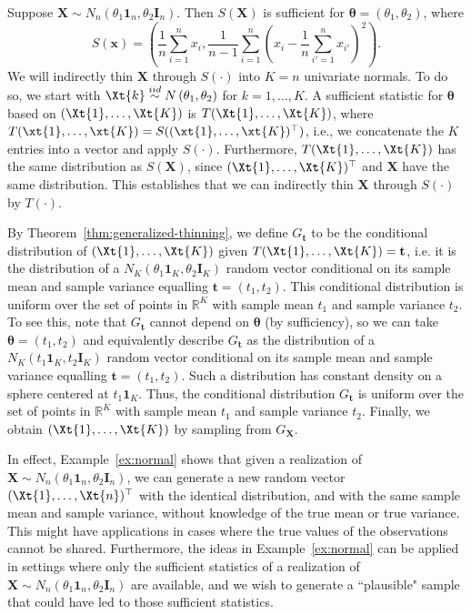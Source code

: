 \documentclass[12pt]{article}
\begin{document}
\begin{exmp} \label{ex:normal} 
Suppose $\mathbf{X}\sim N_n(\theta_1\mathbf{1}_n, \theta_2\mathbf{I}_n)$. Then $S(\mathbf{X})$ is sufficient for $\boldsymbol\theta=(\theta_1,\theta_2)$, where
$$
S(\mathbf{x}) =  \left( \frac{1}{n} \sum_{i=1}^n x_i, \frac{1}{n-1}\sum_{i=1}^{n}\left(x_i -  \frac{1}{n} \sum_{i'=1}^n x_{i'}\right)^2 \right).
$$ 
We will indirectly thin $\mathbf{X}$ through $S(\cdot)$ into $K=n$ univariate normals.
To do so, we start with  $\Xt{k} \overset{iid}{\sim} N\left(\theta_1,\theta_2\right)$ for $k=1,\ldots,K$. A sufficient statistic for $\boldsymbol\theta$ based on $(\Xt{1},\ldots,\Xt{K})$ is $T(\Xt{1},\ldots,\Xt{K})$,  where
$T(\xt{1},\ldots,\xt{K})=S((\xt{1},\ldots,\xt{K})^\top)$,
i.e., we concatenate the $K$ entries into a vector and apply $S(\cdot)$.  
Furthermore, $T(\Xt{1},\ldots,\Xt{K})$ has the same distribution as $S(\mathbf{X})$, since  $(\Xt{1},\ldots,\Xt{K})^\top$ and $\mathbf{X}$ have the same distribution. 
This establishes that we can indirectly thin $\mathbf{X}$ through $S(\cdot)$ by $T(\cdot)$. 

By Theorem~\ref{thm:generalized-thinning}, we define $G_{\mathbf{t}}$ to be the conditional distribution of  $(\Xt{1},\ldots,\Xt{K})$ given $T(\Xt{1},\ldots,\Xt{K})=\mathbf{t}$, i.e. it is the distribution of a $N_K(\theta_1\mathbf{1}_K, \theta_2\mathbf{I}_K)$ random vector conditional on its sample mean and sample variance equalling $\mathbf{t}=(t_1,t_2)$.  
This conditional distribution is uniform over the set of points in $\mathbb{R}^K$ with sample mean $t_1$ and sample variance $t_2$.  To see this, note that $G_{\mathbf{t}}$ cannot depend on $\boldsymbol\theta$ (by sufficiency), so we can take $\boldsymbol\theta=(t_1,t_2)$ and equivalently describe $G_{\mathbf{t}}$ as the distribution of a $N_K(t_1\mathbf{1}_K, t_2\mathbf{I}_K)$ random vector conditional on its sample mean and sample variance equalling $\mathbf{t}=(t_1,t_2)$.  Such a distribution has constant density on a sphere centered at $t_1\mathbf{1}_K$.  Thus, the conditional distribution $G_{\mathbf{t}}$ is uniform over the set of points in $\mathbb{R}^K$ with sample mean $t_1$ and sample variance $t_2$. Finally, we obtain $(\Xt{1},\ldots,\Xt{K})$ by sampling from $G_{\mathbf{X}}$.
\end{exmp}
In effect, Example~\ref{ex:normal} shows that given a realization of $\mathbf{X}\sim N_n(\theta_1\mathbf{1}_n, \theta_2\mathbf{I}_n)$, we can generate a new random vector $(\Xt{1},\ldots,\Xt{n})^\top$ with the identical distribution,  and with the same sample mean and sample variance, without knowledge of the true mean or true variance. 
This might have applications in cases where the true values of the observations cannot be shared. 
Furthermore, the ideas in  Example~\ref{ex:normal} can be applied in settings where only the sufficient statistics of a realization of $\mathbf{X}\sim N_n(\theta_1\mathbf{1}_n, \theta_2\mathbf{I}_n)$ are available, and we wish to generate a ``plausible" sample that could have led to those sufficient statistics. 
\end{document}
